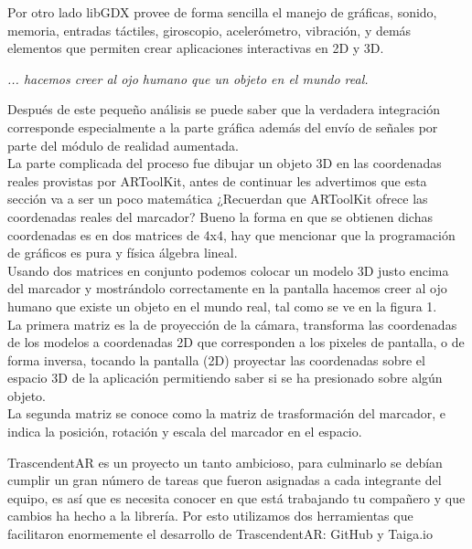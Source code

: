 \begin{multicols}{2}
Por otro lado libGDX provee de forma sencilla el manejo de gráficas, sonido, memoria, entradas táctiles, giroscopio, acelerómetro, vibración, y demás elementos que permiten crear aplicaciones interactivas en 2D y 3D.

\begin{entradilla}
{\em ... hacemos creer al ojo humano que {\color{introcolor}{existe}} un objeto en el mundo real.} 
\end{entradilla}

Después de este pequeño análisis se puede saber que la verdadera integración corresponde especialmente a la parte gráfica además del envío de señales por parte del módulo de realidad aumentada. 
\\

La parte complicada del proceso fue dibujar un objeto 3D en las coordenadas reales provistas por ARToolKit, antes de continuar les advertimos que esta sección va a ser un poco matemática ¿Recuerdan que ARToolKit ofrece las coordenadas reales del marcador? Bueno la forma en que se obtienen dichas coordenadas es en dos  matrices de 4x4, hay que mencionar que la programación de gráficos es pura y física álgebra lineal. 
\\

Usando dos matrices en conjunto podemos colocar un modelo 3D justo encima del marcador y mostrándolo correctamente en la pantalla hacemos creer al ojo humano que existe un objeto en el mundo real, tal como se ve en la figura 1. 
\\

La primera matriz es la de proyección de la cámara, transforma las coordenadas de los modelos a coordenadas 2D que corresponden a los pixeles de pantalla, o de forma inversa, tocando la pantalla (2D) proyectar las coordenadas sobre el espacio 3D de la aplicación permitiendo saber si se ha presionado sobre algún objeto.
\\

La segunda matriz se conoce como la matriz de trasformación del marcador, e indica la posición, rotación y escala del marcador en el espacio.



TrascendentAR es un proyecto un tanto ambicioso, para culminarlo se debían cumplir un gran número de tareas que fueron asignadas a cada integrante del equipo, es así que es necesita conocer en que está trabajando tu compañero y que cambios ha hecho a la librería. Por esto utilizamos dos herramientas que facilitaron enormemente el desarrollo de TrascendentAR: GitHub y Taiga.io\\


\end{multicols}
